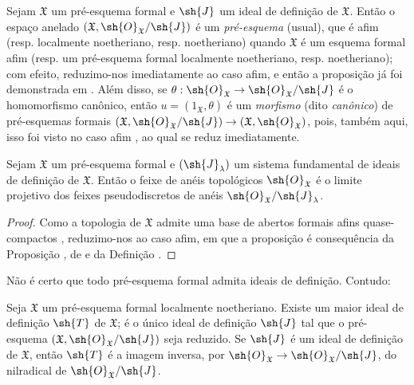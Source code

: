 \documentclass[oneside]{amsart}
\makeatletter
\newcommand{\ega@arrow}[2]{\mathchoice{#1}{#2}{#2}{#2}}
\renewcommand{\to}{\ega@arrow{\longrightarrow}{\rightarrow}}
\let\EGAOriginalLabel\label
\renewcommand{\label}[1]{\phantomsection\EGAOriginalLabel{#1}}
\makeatother
\begin{document}
\begin{env}[10.5.2]
\label{I.10.5.2}
Sejam $\mathfrak{X}$ um pré-esquema formal e $\sh{J}$ um ideal de definição de $\mathfrak{X}$.
Então o espaço anelado $(\mathfrak{X},\sh{O}_\mathfrak{X}/\sh{J})$ é um \emph{pré-esquema} (usual), que é afim (resp. localmente noetheriano, resp. noetheriano) quando $\mathfrak{X}$ é um esquema formal afim (resp. um pré-esquema formal localmente noetheriano, resp. noetheriano); com efeito, reduzimo-nos imediatamente ao caso afim, e então a proposição já foi demonstrada em .
Além disso, se $\theta:\sh{O}_\mathfrak{X}\to\sh{O}_\mathfrak{X}/\sh{J}$ é o homomorfismo canônico, então $u=(1_\mathfrak{X},\theta)$ é um \emph{morfismo} (dito \emph{canônico}) de pré-esquemas formais $(\mathfrak{X},\sh{O}_\mathfrak{X}/\sh{J})\to(\mathfrak{X},\sh{O}_\mathfrak{X})$, pois, também aqui, isso foi visto no caso afim , ao qual se reduz imediatamente.
\end{env}

\begin{proposition}[10.5.3]
\label{I.10.5.3}
Sejam $\mathfrak{X}$ um pré-esquema formal e $(\sh{J}_\lambda)$ um sistema fundamental de ideais de definição de $\mathfrak{X}$.
Então o feixe de anéis topológicos $\sh{O}_\mathfrak{X}$ é o limite projetivo dos feixes pseudodiscretos de anéis  $\sh{O}_\mathfrak{X}/\sh{J}_\lambda$.
\end{proposition}

\begin{proof}
Como a topologia de $\mathfrak{X}$ admite uma base de abertos formais afins quase-compactos , reduzimo-nos ao caso afim, em que a proposição é consequência da Proposição , de  e da Definição .
\end{proof}

Não é certo que todo pré-esquema formal admita ideais de definição.
Contudo:
\begin{proposition}[10.5.4]
\label{I.10.5.4}
Seja $\mathfrak{X}$ um pré-esquema formal localmente noetheriano.
Existe um maior ideal de definição $\sh{T}$ de $\mathfrak{X}$; é o único ideal de definição $\sh{J}$ tal que o pré-esquema $(\mathfrak{X},\sh{O}_\mathfrak{X}/\sh{J})$ seja reduzido.
Se $\sh{J}$ é um ideal de definição de $\mathfrak{X}$, então $\sh{T}$ é a imagem inversa, por $\sh{O}_\mathfrak{X}\to\sh{O}_\mathfrak{X}/\sh{J}$, do nilradical de $\sh{O}_\mathfrak{X}/\sh{J}$.
\end{proposition}
\end{document}
